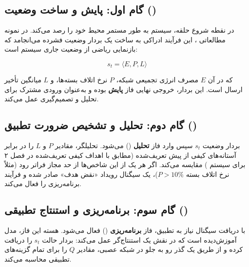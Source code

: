 \documentclass[oneside,openany,phd]{TMU-Thesis}
\begin{document}
\subsection{گام اول: پایش و ساخت وضعیت ()}

\label{subsec:monitoring-feature}



در نقطه شروع حلقه، سیستم به طور مستمر محیط خود را رصد می‌کند. در نمونه مطالعاتی  \cite{gerostathopoulos2019deltaiot}، این فرآیند ادراکی به ساخت یک بردار وضعیت فشرده می‌انجامد که بازنمایی ریاضی از وضعیت جاری سیستم است:

\begin{equation}
s_t = \langle E, P, L \rangle
\label{eq:state_vector_new}
\end{equation}

که در آن $E$ مصرف انرژی تجمیعی شبکه، $P$ نرخ اتلاف بسته‌ها، و $L$ میانگین تأخیر ارسال است. این بردار، خروجی نهایی فاز \textbf{پایش} بوده و به‌عنوان ورودی مشترک برای تحلیل و تصمیم‌گیری عمل می‌کند.



\subsection{گام دوم: تحلیل و تشخیص ضرورت تطبیق ()}

\label{subsec:analysis-context}



بردار وضعیت $s_t$ سپس وارد فاز \textbf{تحلیل} () می‌شود. تحلیلگر، مقادیر $P$ و $L$ را در برابر آستانه‌های کیفی از پیش تعریف‌شده (مطابق با اهداف کیفی تعریف‌شده در فصل ۲ برای سیستم  \cite{gerostathopoulos2019deltaiot}) مقایسه می‌کند. اگر هر یک از این شاخص‌ها از حد مجاز فراتر رود (مثلاً نرخ اتلاف بسته $P > 10\%$)، یک سیگنال رویداد «نقض هدف» صادر شده و فرآیند برنامه‌ریزی را فعال می‌کند.



\subsection{گام سوم: برنامه‌ریزی و استنتاج تطبیقی ()}

\label{subsec:planning-prediction}



با دریافت سیگنال نیاز به تطبیق، فاز \textbf{برنامه‌ریزی} () فعال می‌شود. هسته این فاز، مدل آموزش‌دیده  است که در نقش یک استنتاج‌گر عمل می‌کند: بردار حالت $s_t$ را دریافت کرده و از طریق یک گذر رو به جلو در شبکه عصبی، مقادیر $Q$ را برای تمام گزینه‌های تطبیقی محاسبه می‌کند.
\end{document}
